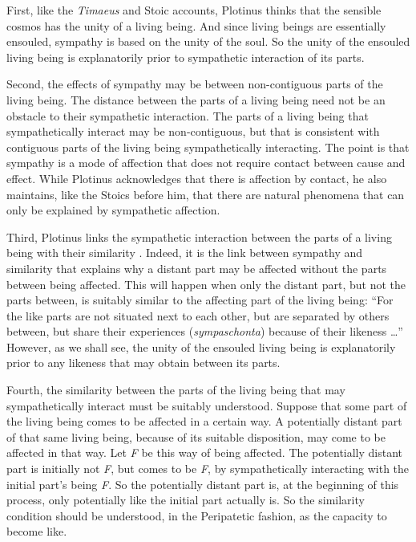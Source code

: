 First, like the \emph{Timaeus} and Stoic accounts, Plotinus thinks that the sensible cosmos has the unity of a living being. And since living beings are essentially ensouled, sympathy is based on the unity of the soul. So the unity of the ensouled living being is explanatorily prior to sympathetic interaction of its parts.

Second, the effects of sympathy may be between non-contiguous parts of the living being. The distance between the parts of a living being need not be an obstacle to their sympathetic interaction. The parts of a living being that sympathetically interact may be non-contiguous, but that is consistent with contiguous parts of the living being sympathetically interacting. The point is that sympathy is a mode of affection that does not require contact between cause and effect. While Plotinus acknowledges that there is affection by contact, he also maintains, like the Stoics before him, that there are natural phenomena that can only be explained by sympathetic affection.

Third, Plotinus links the sympathetic interaction between the parts of a living being with their similarity \citep{Emilsson:1988uq,Emilsson:2015wf}. Indeed, it is the link between sympathy and similarity that explains why a distant part may be affected without the parts between being affected. This will happen when only the distant part, but not the parts between, is suitably similar to the affecting part of the living being: ``For the like parts are not situated next to each other, but are separated by others between, but share their experiences (\emph{sympaschonta}) because of their likeness \ldots'' However, as we shall see, the unity of the ensouled living being is explanatorily prior to any likeness that may obtain between its parts.

Fourth, the similarity between the parts of the living being that may sympathetically interact must be suitably understood. Suppose that some part of the living being comes to be affected in a certain way. A potentially distant part of that same living being, because of its suitable disposition, may come to be affected in that way. Let \emph{F} be this way of being affected. The potentially distant part is initially not \emph{F}, but comes to be \emph{F}, by sympathetically interacting with the initial part's being \emph{F}. So the potentially distant part is, at the beginning of this process, only potentially like the initial part actually is. So the similarity condition should be understood, in the Peripatetic fashion, as the capacity to become like.


